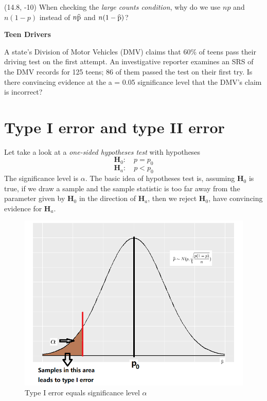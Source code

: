 \documentclass[a4paper, 12pt,twoside]{book}
\newcommand\reallywidehat[1]{%
\savestack{\tmpbox}{\stretchto{%
  \scaleto{%
    \scalerel*[\widthof{\ensuremath{#1}}]{\kern-.6pt\bigwedge\kern-.6pt}%
    {\rule[-\textheight/2]{1ex}{\textheight}}%
  }{\textheight}%
}{0.5ex}}%
\stackon[1pt]{#1}{\tmpbox}%
}
\begin{document}
    \begin{textblock}{3.6}(14.8, -10)
    When checking the \textit{large counts condition}, why do we use $np$ and $n(1-p)$ instead of $n\reallywidehat{p}$ and $n(1-\reallywidehat{p})$?
    \end{textblock}
\newpage
\colorbox{champagne}{\parbox{\textwidth}{
\textbf{Teen Drivers}\vspace{0.3cm}

 A state’s Division of Motor Vehicles (DMV) claims that 60\% of teens pass their driving test on the first attempt. An investigative reporter examines an SRS of the DMV records for 125 teens; 86 of them passed the test on their first try. Is there convincing evidence at the a = 0.05 significance level that the DMV’s claim is incorrect? 
}}
\newpage

\section{Type I error and type II error}

Let take a look at a \textit{one-sided hypotheses test} with hypotheses 
$$\textbf{H}_0: \quad p=p_0$$
$$\textbf{H}_a: \quad p<p_0$$
The significance level is $\alpha$.
The basic idea of hypotheses test is, assuming $\textbf{H}_0$ is true, if we draw a sample and the sample statistic is too far away from the parameter given by $\textbf{H}_0$ in the direction of $\textbf{H}_a$, then we reject $\textbf{H}_0$, have convincing evidence for $\textbf{H}_a$.

  \begin{figure}[H]
  \centering
  \includegraphics[scale=0.5]{TypeOneError}
  \caption{Type I error equals significance level $\alpha$}
  \label{TypeOneError}
  \end{figure}
\end{document}
